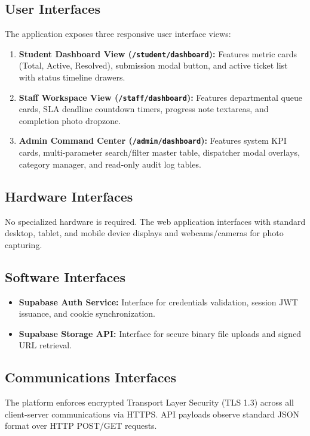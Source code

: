 \documentclass[12pt, a4paper]{article}
\begin{document}
\subsection{User Interfaces}
The application exposes three responsive user interface views:
\begin{enumerate}[leftmargin=*]
    \item \textbf{Student Dashboard View (\texttt{/student/dashboard}):} Features metric cards (Total, Active, Resolved), submission modal button, and active ticket list with status timeline drawers.
    \item \textbf{Staff Workspace View (\texttt{/staff/dashboard}):} Features departmental queue cards, SLA deadline countdown timers, progress note textareas, and completion photo dropzone.
    \item \textbf{Admin Command Center (\texttt{/admin/dashboard}):} Features system KPI cards, multi-parameter search/filter master table, dispatcher modal overlays, category manager, and read-only audit log tables.
\end{enumerate}

\subsection{Hardware Interfaces}
No specialized hardware is required. The web application interfaces with standard desktop, tablet, and mobile device displays and webcams/cameras for photo capturing.

\subsection{Software Interfaces}
\begin{itemize}[leftmargin=*]
    \item \textbf{Supabase Auth Service:} Interface for credentials validation, session JWT issuance, and cookie synchronization.
    \item \textbf{Supabase Storage API:} Interface for secure binary file uploads and signed URL retrieval.
\end{itemize}

\subsection{Communications Interfaces}
The platform enforces encrypted Transport Layer Security (TLS 1.3) across all client-server communications via HTTPS. API payloads observe standard JSON format over HTTP POST/GET requests.
\end{document}
